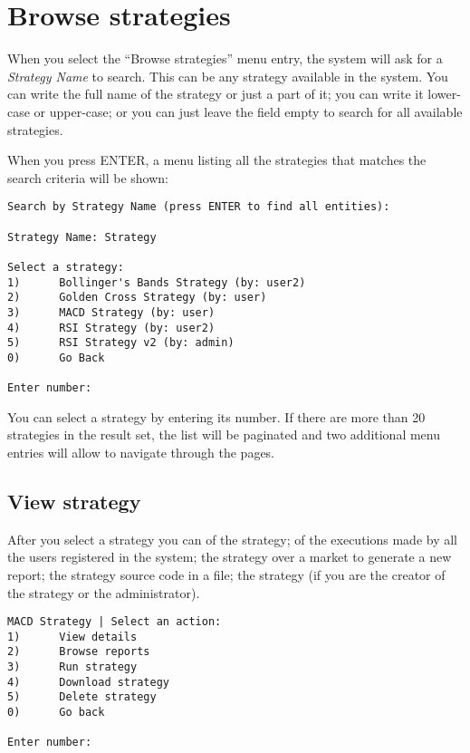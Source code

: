 \section{Browse strategies}\label{sec:browsestrategies}

When you select the ``Browse strategies'' menu entry, the system will ask for a
\emph{Strategy Name} to search. This can be any strategy available in the
system. You can write the full name of the strategy or just a part of it; you
can write it lower-case or upper-case; or you can just leave the field empty to
search for all available strategies.

When you press ENTER, a menu listing all the strategies that matches the search
criteria will be shown:

\begin{verbatim}
Search by Strategy Name (press ENTER to find all entities):

Strategy Name: Strategy

Select a strategy:
1)      Bollinger's Bands Strategy (by: user2)
2)      Golden Cross Strategy (by: user)
3)      MACD Strategy (by: user)
4)      RSI Strategy (by: user2)
5)      RSI Strategy v2 (by: admin)
0)      Go Back

Enter number:
\end{verbatim}

You can select a strategy by entering its number. If there are more than 20
strategies in the result set, the list will be paginated and two additional menu
entries will allow to navigate through the pages.

\subsection{View strategy}

After you select a strategy you can  of the strategy;
 of the executions made by all the users registered
in the system;  the strategy over a market to generate a new
report;  the strategy source code in a file;
 the strategy (if you are the creator of the strategy or the
administrator).

\begin{verbatim}
MACD Strategy | Select an action:
1)      View details
2)      Browse reports
3)      Run strategy
4)      Download strategy
5)      Delete strategy
0)      Go back

Enter number:
\end{verbatim}


